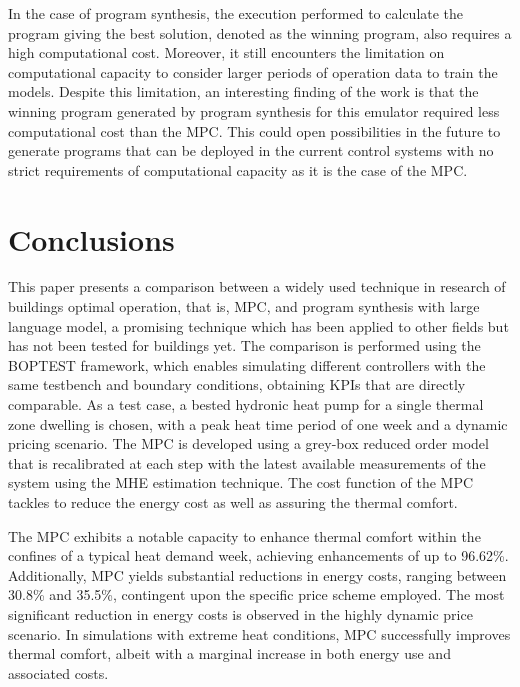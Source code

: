In the case of program synthesis, the execution performed to calculate the program giving the best solution, denoted as the winning program, also requires a high computational cost. Moreover, it still encounters the limitation on computational capacity to consider larger periods of operation data to train the models. Despite this limitation, an interesting finding of the work is that the winning program generated by program synthesis for this emulator required less computational cost than the MPC. This could open possibilities in the future to generate programs that can be deployed in the current control systems with no strict requirements of computational capacity as it is the case of the MPC.

\newpage
\section{Conclusions}
\label{sec:boptest-conclusion}
This paper presents a comparison between a widely used technique in research of buildings optimal operation, that is, MPC, and program synthesis with large language model, a promising technique which has been applied to other fields but has not been tested for buildings yet. The comparison is performed using the BOPTEST framework, which enables simulating different controllers with the same testbench and boundary conditions, obtaining KPIs that are directly comparable. As a test case, a bested hydronic heat pump for a single thermal zone dwelling is chosen, with a peak heat time period of one week and a dynamic pricing scenario. The MPC is developed using a grey-box reduced order model that is recalibrated at each step with the latest available measurements of the system using the MHE estimation technique. The cost function of the MPC tackles to reduce the energy cost as well as assuring the thermal comfort. 

The MPC exhibits a notable capacity to enhance thermal comfort within the confines of a typical heat demand week, achieving enhancements of up to 96.62\%. Additionally, MPC yields substantial reductions in energy costs, ranging between 30.8\% and 35.5\%, contingent upon the specific price scheme employed. The most significant reduction in energy costs is observed in the highly dynamic price scenario. In simulations with extreme heat conditions, MPC successfully improves thermal comfort, albeit with a marginal increase in both energy use and associated costs.

